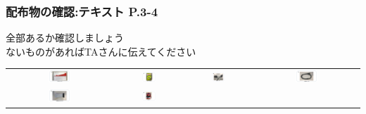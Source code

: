\documentclass[dvipdfmx]{beamer}
\begin{document}
\begin{frame}[fragile]
	\frametitle{配布物の確認:テキスト P.3-4~~~}
	\begin{center}
	{\large \color{red} 全部あるか確認しましょう\\
		ないものがあればTAさんに伝えてください} 
	\end{center}
	\vfill
	\begin{tabular}{cccc}
  \includegraphics[width=0.22\textwidth]{textbook-img009-2023.png}
   &
		\includegraphics[width=0.22\textwidth]{textbook-img010.png} &

  \includegraphics[width=0.22\textwidth]{textbook-img007.png}
   &
  \includegraphics[width=0.22\textwidth]{textbook-img008-2023.png} \\

  \includegraphics[width=0.22\textwidth]{textbook-img005-2023.png}
   &
		\includegraphics[width=0.22\textwidth]{textbook-img006.png} &


\end{tabular}
\end{frame}
\end{document}

